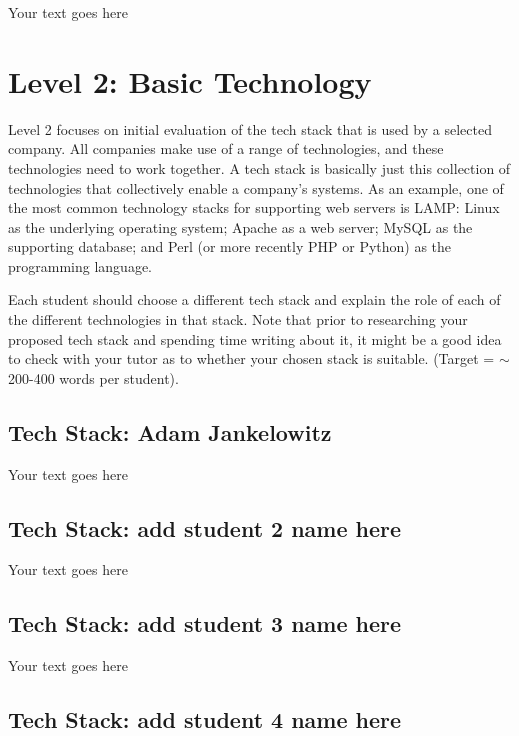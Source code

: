 \documentclass[a4paper, 11pt]{report}
\begin{document}
Your text goes here



\newpage
\section{Level 2: Basic Technology}

Level 2 focuses on initial evaluation of the tech stack that is used by a selected company. All companies make use of a range of technologies, and these technologies need to work together. A tech stack is basically just this collection of technologies that collectively enable a company's systems. As an example, one of the most common technology stacks for supporting web servers is LAMP: Linux as the underlying operating system; Apache as a web server; MySQL as the supporting database; and Perl (or more recently PHP or Python) as the programming language.

Each student should choose a different tech stack and explain the role of each of the different technologies in that stack. Note that prior to researching your proposed tech stack and spending time writing about it, it might be a good idea to check with your tutor as to whether your chosen stack is suitable. (Target = $\sim$200-400 words per student).

\subsection{Tech Stack: Adam Jankelowitz}

Your text goes here

\subsection{Tech Stack: add student 2 name here}

Your text goes here

\subsection{Tech Stack: add student 3 name here}

Your text goes here

\subsection{Tech Stack: add student 4 name here}
\end{document}
